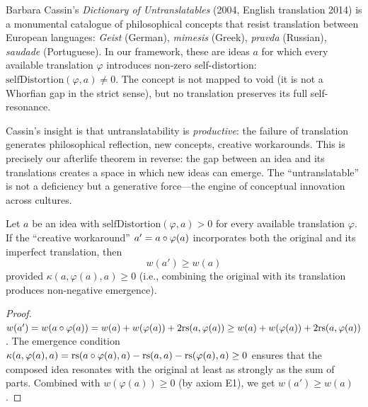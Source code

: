 \begin{remark}
Barbara Cassin's \textit{Dictionary of Untranslatables} (2004, English translation 2014) is a monumental catalogue of philosophical concepts that resist translation between European languages: \emph{Geist} (German), \emph{mimesis} (Greek), \emph{pravda} (Russian), \emph{saudade} (Portuguese).  In our framework, these are ideas $a$ for which every available translation $\varphi$ introduces non-zero self-distortion: $\mathrm{selfDistortion}(\varphi, a) \neq 0$.  The concept is not mapped to void (it is not a Whorfian gap in the strict sense), but no translation preserves its full self-resonance.

Cassin's insight is that untranslatability is \emph{productive}: the failure of translation generates philosophical reflection, new concepts, creative workarounds.  This is precisely our afterlife theorem in reverse: the gap between an idea and its translations creates a space in which new ideas can emerge.  The ``untranslatable'' is not a deficiency but a generative force---the engine of conceptual innovation across cultures.
\end{remark}

\begin{theorem}
\label{thm:productive-untranslatability}
Let $a$ be an idea with $\mathrm{selfDistortion}(\varphi, a) > 0$ for every available translation $\varphi$.  If the ``creative workaround'' $a' = a \circ \varphi(a)$ incorporates both the original and its imperfect translation, then
\[
  w(a') \geq w(a)
\]
provided $\kappa(a, \varphi(a), a) \geq 0$ (i.e., combining the original with its translation produces non-negative emergence).
\end{theorem}

\begin{proof}
$w(a') = w(a \circ \varphi(a)) = w(a) + w(\varphi(a)) + 2\mathrm{rs}(a, \varphi(a)) \geq w(a) + w(\varphi(a)) + 2\mathrm{rs}(a, \varphi(a))$.  The emergence condition $\kappa(a, \varphi(a), a) = \mathrm{rs}(a \circ \varphi(a), a) - \mathrm{rs}(a, a) - \mathrm{rs}(\varphi(a), a) \geq 0$ ensures that the composed idea resonates with the original at least as strongly as the sum of parts.  Combined with $w(\varphi(a)) \geq 0$ (by axiom E1), we get $w(a') \geq w(a)$.
\end{proof}

